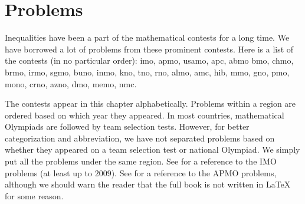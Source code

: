 \documentclass{subfile}
\begin{document}
	\chapter{Problems}\label{ch:problems}
	Inequalities have been a part of the mathematical contests for a long time. We have borrowed a lot of problems from these prominent contests. Here is a list of the contests (in no particular order): \Gls{imo}, \Gls{apmo}, \Gls{usamo}, \Gls{apc}, \Gls{abmo} \Gls{bmo}, \Gls{chmo}, \Gls{brmo}, \Gls{irmo}, \Gls{sgmo}, \Gls{buno}, \Gls{inmo}, \Gls{kno}, \Gls{tno}, \Gls{rno}, \Gls{almo}, \Gls{amc}, \Gls{hib}, \Gls{mmo}, \Gls{gno}, \Gls{pmo}, \Gls{mono}, \Gls{crno}, \Gls{azno}, \Gls{dmo}, \Gls{memo}, \Gls{nmc}.
	
	The contests appear in this chapter alphabetically. Problems within a region are ordered based on which year they appeared. In most countries, mathematical Olympiads are followed by team selection tests. However, for better categorization and abbreviation, we have not separated problems based on whether they appeared on a team selection test or national Olympiad. We simply put all the problems under the same region. See \textcite{djukicc_jankovic_matic_2011} for a reference to the IMO problems (at least up to $2009$). See \textcite{dongphd_suugaku_2009} for a reference to the APMO problems, although we should warn the reader that the full book is not written in \LaTeX{} for some reason.
\end{document}
